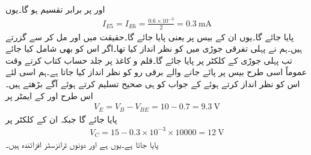  اور  پر  برابر تقسیم ہو گا۔یوں
\begin{align*}
I_{E5}=I_{E6}=\frac{0.6 \times 10^{-3}}{2}=\SI{0.3}{\milli \ampere}
\end{align*}
پایا جائے گا۔یوں ان کے بیس پر  یعنی  پایا جائے گا۔حقیقت میں  اور  مل کر  سے گزرتے ہیں۔ہم نے پہلی تفرقی جوڑی میں  کو نظر انداز کیا تھا۔اگر اس کو بھی شامل کیا جائے تب پہلی جوڑی کے کلکٹر پر  پایا جائے گا۔قلم و کاغذ پر جلد حساب کتاب کرتے وقت عموماً اسی طرح بیس پر پائے جانے والے برقی رو کو نظر انداز کیا جاتا ہے۔ہم اسی لئے اس کو نظر انداز کرتے ہوئے  کے جواب کو ہی صحیح تسلیم کرتے ہوئے آگے بڑھتے ہیں۔اس طرح  اور  کے ایمٹر پر
\begin{align*}
V_{E}=V_{B}-V_{BE}=10-0.7=\SI{9.3}{\volt}
\end{align*}
پایا جائے گا جبکہ ان کے کلکٹر پر 
\begin{align*}
V_{C}=15 -0.3 \times 10^{-3} \times 10000=\SI{12}{\volt}
\end{align*}
پایا جاتا ہے۔یوں  ہے اور دونوں ٹرانزسٹر افزائندہ ہیں۔

